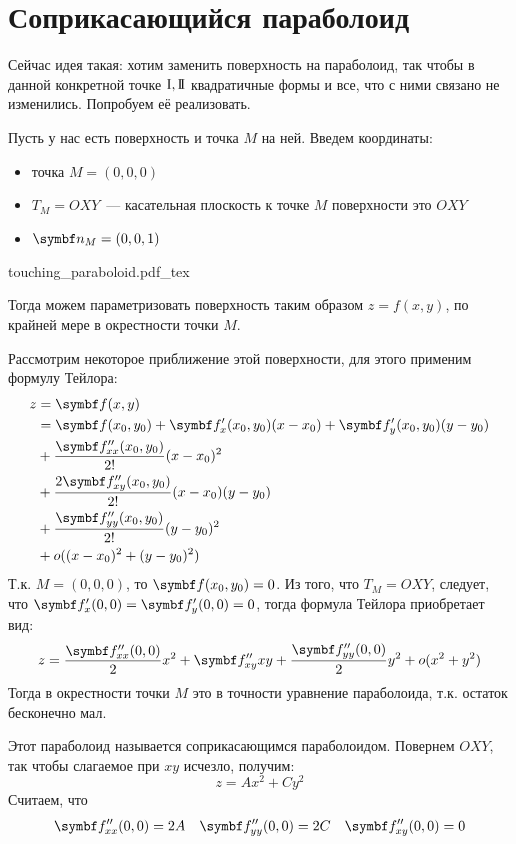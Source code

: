 \documentclass[main]{subfiles}
\begin{document}
\chapter{Соприкасающийся параболоид}
Сейчас идея такая: хотим заменить поверхность на параболоид, так чтобы в данной конкретной точке $\mathrm{I}, \mathrm{I\!I}$ квадратичные формы и все, что с ними связано не изменились.
Попробуем её реализовать.

Пусть у нас есть поверхность и точка $M$ на ней.
Введем координаты:
\begin{itemize}
    \item точка $M = (0,0,0)$
    \item $T_M = OXY$~--- касательная плоскость к точке $M$ поверхности это $OXY$
    \item $\vn_M = (0,0,1)$
\end{itemize}
\begin{center}
    \def\svgwidth{0.5\linewidth}
    {touching_paraboloid.pdf_tex}
\end{center}
Тогда можем параметризовать поверхность таким образом $z = f(x,y)$, по крайней мере в окрестности точки $M$.

Рассмотрим некоторое приближение этой поверхности, для этого применим формулу Тейлора:
\begin{align*}
    z & = \vf(x,y)                                                       \\
      & = \vf(x_0,y_0) + \vf'_x(x_0,y_0)(x-x_0) + \vf'_y(x_0,y_0)(y-y_0) \\
      & + \frac{\vf''_{xx}(x_0,y_0)}{2!}(x-x_0)^2                        \\
      & + \frac{2 \vf''_{xy}(x_0,y_0)}{2!}(x- x_0)(y-y_0)                \\
      & + \frac{\vf''_{yy}(x_0,y_0)}{2!}(y-y_0)^2                        \\
      & +o((x-x_0)^2 +(y-y_0)^2)
\end{align*}
Т.к. $M = (0,0,0)$, то $\vf(x_0,y_0) = 0$.
Из того, что $T_M = OXY$, следует, что $\vf'_x(0,0) = \vf'_y(0,0)=0$, тогда формула Тейлора приобретает вид:
\[z = \frac{\vf''_{xx}(0,0)}{2}x^2 + \vf''_{xy}xy + \frac{\vf''_{yy}(0,0)}{2} y^2 + o(x^2 + y^2)\]
Тогда в окрестности точки $M$ это в точности уравнение параболоида, т.к. остаток бесконечно мал.
\begin{definition}
    Этот параболоид называется соприкасающимся параболоидом.
    Повернем $OXY$, так чтобы  слагаемое при $xy$ исчезло, получим:
    \[z = Ax^2 + Cy^2\]
    Считаем, что
    \begin{align*}
        \vf''_{xx}(0,0) & = 2A & \vf''_{yy}(0,0) & =2C & \vf''_{xy}(0,0) = 0
    \end{align*}
\end{definition}
\end{document}
